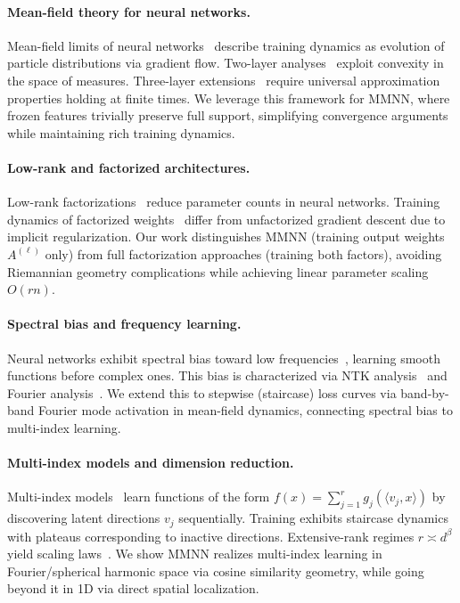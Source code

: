 \documentclass{article}
\begin{document}
\paragraph{Mean-field theory for neural networks.}
Mean-field limits of neural networks~\cite{mei2018mean,chizat2018global,rotskoff2018neural} describe training dynamics as evolution of particle distributions via gradient flow. Two-layer analyses~\cite{chizat2018global,mei2019mean} exploit convexity in the space of measures. Three-layer extensions~\cite{nguyen2021proof} require universal approximation properties holding at finite times. We leverage this framework for MMNN, where frozen features trivially preserve full support, simplifying convergence arguments while maintaining rich training dynamics.

\paragraph{Low-rank and factorized architectures.}
Low-rank factorizations~\cite{sainath2013low,novikov2015tensorizing} reduce parameter counts in neural networks. Training dynamics of factorized weights~\cite{arora2018optimization} differ from unfactorized gradient descent due to implicit regularization. Our work distinguishes MMNN (training output weights \( A^{(\ell)} \) only) from full factorization approaches (training both factors), avoiding Riemannian geometry complications while achieving linear parameter scaling \( O(rn) \).

\paragraph{Spectral bias and frequency learning.}
Neural networks exhibit spectral bias toward low frequencies~\cite{rahaman2019spectral,xu2019training}, learning smooth functions before complex ones. This bias is characterized via NTK analysis~\cite{basri2020frequency} and Fourier analysis~\cite{tancik2020fourier}. We extend this to stepwise (staircase) loss curves via band-by-band Fourier mode activation in mean-field dynamics, connecting spectral bias to multi-index learning.

\paragraph{Multi-index models and dimension reduction.}
Multi-index models~\cite{benarous2021online,damian2022neural,abbe2023sgd} learn functions of the form \( f(x) = \sum_{j=1}^r g_j(\langle v_j, x \rangle) \) by discovering latent directions \( v_j \) sequentially. Training exhibits staircase dynamics with plateaus corresponding to inactive directions. Extensive-rank regimes \( r \asymp d^\beta \) yield scaling laws~\cite{damian2022neural}. We show MMNN realizes multi-index learning in Fourier/spherical harmonic space via cosine similarity geometry, while going beyond it in 1D via direct spatial localization.
\end{document}
